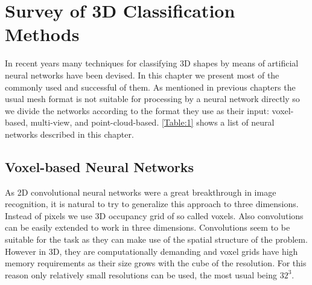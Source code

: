 \chapter{Survey of 3D Classification Methods}
\label{sec:chap3}
In recent years many techniques for classifying 3D shapes by means of artificial neural networks have been devised. In this chapter we present most of the commonly used and successful of them. As mentioned in previous chapters the usual mesh format is not suitable for processing by a neural network directly so we divide the networks according to the format they use as their input: voxel-based, multi-view, and point-cloud-based. \autoref{Table:1} shows a list of neural networks described in this chapter.



\section{Voxel-based Neural Networks}
As 2D convolutional neural networks were a great breakthrough in image recognition, it is natural to try to generalize this approach to three dimensions. Instead of pixels we use 3D occupancy grid of so called voxels. Also convolutions can be easily extended to work in three dimensions. Convolutions seem to be suitable for the task as they can make use of the spatial structure of the problem. However in 3D, they are computationally demanding and voxel grids have high memory requirements as their size grows with the cube of the resolution. For this reason only relatively small resolutions can be used, the most usual being $32^3$. 

